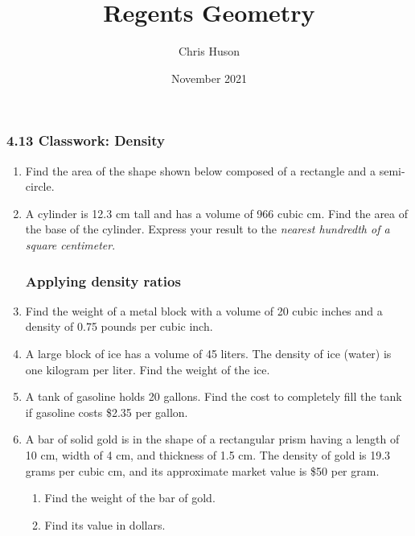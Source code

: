 \documentclass[12pt, twoside]{article}
\title{Regents Geometry}
\author{Chris Huson}
\date{November 2021}
\begin{document}
\subsubsection*{4.13 Classwork: Density}
\begin{enumerate}
  \item Find the area of the shape shown below composed of a rectangle and a semi-circle.
  \begin{flushright}
\end{flushright}

\item A cylinder is 12.3 cm tall and has a volume of 966 cubic cm. Find the area of the base of the cylinder. Express your result to the \emph{nearest hundredth of a square centimeter}. \vspace{3cm}

\subsubsection*{Applying density ratios}
\item Find the weight of a metal block with a volume of 20 cubic inches and a density of 0.75 pounds per cubic inch. \vspace{3cm}
\item A large block of ice has a volume of 45 liters. The density of ice (water) is one kilogram per liter. Find the weight of the ice.  \vspace{3cm}
\item A tank of gasoline holds 20 gallons. Find the cost to completely fill the tank if gasoline costs \$2.35 per gallon. \vspace{3cm}
\item A bar of solid gold is in the shape of a rectangular prism having a length of 10 cm, width of 4 cm, and thickness of 1.5 cm. The density of gold is 19.3 grams per cubic cm, and its approximate market value is \$50 per gram.
\begin{enumerate}
  \item Find the weight of the bar of gold.  \vspace{3cm}
  \item Find its value in dollars.\vspace{2cm}
\end{enumerate}



\end{enumerate}
\end{document}
